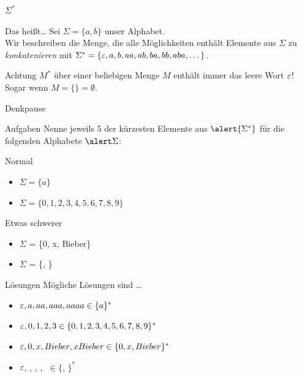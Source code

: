\begin{frame}[fragile]{$\Sigma^\ast$}
    \begin{exampleblock}{Das heißt\dots}
    Sei $\Sigma = \{a,b\}$ unser \alert{Alphabet}.\\
    Wir beschreiben die Menge, die alle Möglichkeiten enthält Elemente aus $\Sigma$ zu \emph{konkatenieren} mit $\Sigma^\ast=\{\varepsilon,a,b,aa,ab,ba,bb,aba,\dots\}$.
    \end{exampleblock}\pause
    
    \begin{alertblock}{Achtung}
    $M^\ast$ über einer beliebigen Menge $M$ enthält immer das leere Wort $\varepsilon$!\\
    Sogar wenn $M = \{\} = \emptyset$.\\
    
    \end{alertblock}
\end{frame}

{
\begin{frame}[fragile]{Denkpause}
    \begin{alertblock}{Aufgaben}
    Nenne jeweils 5 der kürzesten Elemente aus $\alert{\Sigma^{*}}$ für die folgenden Alphabete $\alert\Sigma$:
    \end{alertblock}
    
    \begin{block}{Normal}
        \begin{itemize}
            \item $\Sigma = \{a\}$
            \item $\Sigma = \{0, 1, 2, 3, 4, 5, 6, 7, 8, 9\}$
        \end{itemize}
    \end{block}
    \begin{block}{Etwas schwerer}
        \begin{itemize}
            \item $\Sigma$ = \{0, x, Bieber\}
            \item $\Sigma$ = \{\Smiley, \Frowny\}
        \end{itemize}
    \end{block}
\end{frame}
}

{
\begin{frame}{Lösungen}
    Mögliche Lösungen sind \dots
  \begin{itemize}[<+- | alert@+>]
        \item $\varepsilon, a, aa, aaa, aaaa \in \{a\}^{*}$
        \item $\varepsilon, 0, 1, 2, 3\in \{0,1,2,3,4,5,6,7,8,9\}^{*}$
        \item $\varepsilon, 0, x, Bieber, xBieber \in \{0, x, Bieber\}^{*}$
        \item $\varepsilon$, \Smiley, \Frowny, \Smiley\Smiley, \Smiley\Frowny$\; \in \{$\Smiley, \Frowny$\}^{*}$
    \end{itemize}
\end{frame}
}

